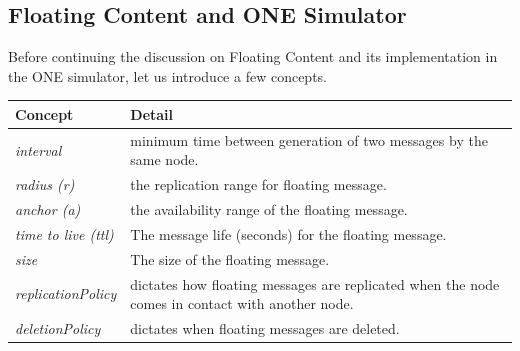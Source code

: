 \subsection{Floating Content and ONE Simulator}
Before continuing the discussion on Floating Content and its implementation in the ONE simulator, let us introduce a few concepts.
\begin{center}
     \label{tab:title}
    \begin{tabular}{ | l | p{11cm} |}
    \hline
    \textbf{Concept} & \textbf{Detail} \\ \hline
    \textit{interval} & minimum time between generation of two messages by the same node. \\ \hline
    \textit{radius (r)} & the replication range for floating message.  \\ \hline
    \textit{anchor (a)} & the availability range of the floating message. \\ \hline
    \textit{time to live (ttl)} & The message life (seconds) for the floating message. \\ \hline
    \textit{size} & The size of the floating message. \\ \hline
    \textit{replicationPolicy} & dictates how floating messages are replicated when the node comes in contact with another node. \\ \hline
    \textit{deletionPolicy} & dictates when floating messages are deleted. \\ \hline
    \end{tabular}
\end{center}
